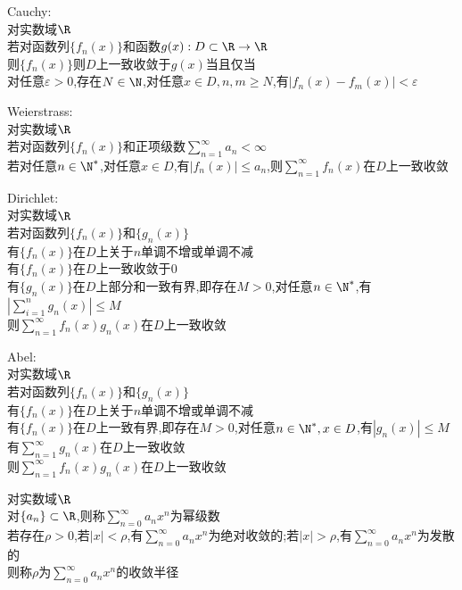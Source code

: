 \begin{dingli}
Cauchy:\\
对实数域$\R$\\
若对函数列$\{f_n(x)\}$和函数$g(x):D\subset \R\to \R$\\
则$\{f_n(x)\}$则$D$上一致收敛于$g(x)$当且仅当\\
对任意$\varepsilon>0$,存在$N\in\N$,对任意$x\in D,n,m\geq N$,有$|f_n(x)-f_m(x)|<\varepsilon$
\end{dingli}

\begin{dingli}
Weierstrass:\\
对实数域$\R$\\
若对函数列$\{f_n(x)\}$和正项级数$\sum\limits_{n=1}^{\infty}a_n<\infty$\\
若对任意$n\in\N^*$,对任意$x\in D$,有$|f_n(x)|\leq a_n$,则$\sum\limits_{n=1}^{\infty}f_n(x)$在$D$上一致收敛
\end{dingli}

\begin{dingli}
Dirichlet:\\
对实数域$\R$\\
若对函数列$\{f_n(x)\}$和$\{g_n(x)\}$\\
有$\{f_n(x)\}$在$D$上关于$n$单调不增或单调不减\\
有$\{f_n(x)\}$在$D$上一致收敛于$0$\\
有$\{g_n(x)\}$在$D$上部分和一致有界,即存在$M>0$,对任意$n\in \N^*$,有$|\sum\limits_{i=1}^{n}g_n(x)|\leq M$\\
则$\sum\limits_{n=1}^{\infty}f_n(x)g_n(x)$在$D$上一致收敛
\end{dingli}

\begin{dingli}
Abel:\\
对实数域$\R$\\
若对函数列$\{f_n(x)\}$和$\{g_n(x)\}$\\
有$\{f_n(x)\}$在$D$上关于$n$单调不增或单调不减\\
有$\{f_n(x)\}$在$D$上一致有界,即存在$M>0$,对任意$n\in \N^*,x\in D$,有$|g_n(x)|\leq M$\\
有$\sum\limits_{n=1}^{\infty}g_n(x)$在$D$上一致收敛\\
则$\sum\limits_{n=1}^{\infty}f_n(x)g_n(x)$在$D$上一致收敛 
\end{dingli}

\begin{dingyi}
对实数域$\R$\\
对$\{a_n\}\subset \R$,则称$\sum\limits_{n=0}^{\infty}a_nx^n$为幂级数\\
若存在$\rho>0$,若$|x|<\rho$,有$\sum\limits_{n=0}^{\infty}a_nx^n$为绝对收敛的;若$|x|>\rho$,有$\sum\limits_{n=0}^{\infty}a_nx^n$为发散的\\
则称$\rho$为$\sum\limits_{n=0}^{\infty}a_nx^n$的收敛半径
\end{dingyi}


